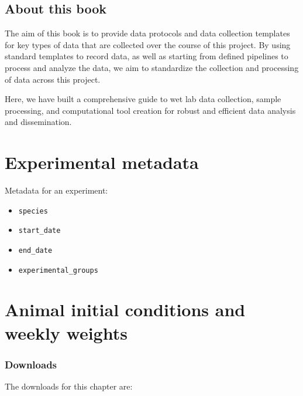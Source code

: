 \documentclass[
]{book}
\providecommand{\tightlist}{%
  \setlength{\itemsep}{0pt}\setlength{\parskip}{0pt}}
\begin{document}
\hypertarget{about-this-book}{%
\section{About this book}\label{about-this-book}}

The aim of this book is to provide data protocols and data collection templates
for key types of data that are collected over the course of this project. By using
standard templates to record data, as well as starting from defined pipelines to
process and analyze the data, we aim to standardize the collection and processing
of data across this project.

Here, we have built a comprehensive guide to wet lab data collection, sample processing, and computational tool creation for robust and efficient data analysis and dissemination.

\hypertarget{experimental-metadata}{%
\chapter{Experimental metadata}\label{experimental-metadata}}

Metadata for an experiment:

\begin{itemize}
\tightlist
\item
  \texttt{species}
\item
  \texttt{start\_date}
\item
  \texttt{end\_date}
\item
  \texttt{experimental\_groups}
\end{itemize}

\hypertarget{animal-initial-conditions-and-weekly-weights}{%
\chapter{Animal initial conditions and weekly weights}\label{animal-initial-conditions-and-weekly-weights}}

\hypertarget{downloads}{%
\subsection{Downloads}\label{downloads}}

The downloads for this chapter are:
\end{document}
